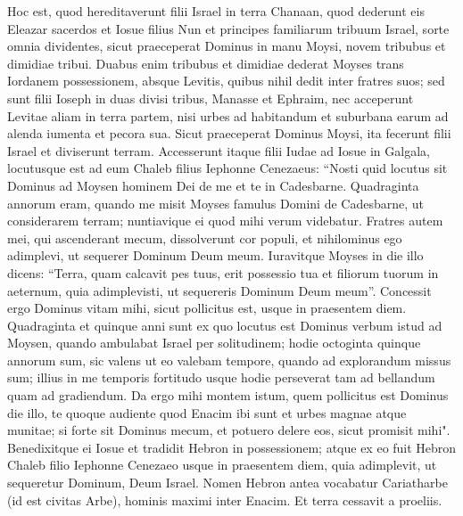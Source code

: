 \begin{biblechapter}  
\verse Hoc est, quod hereditaverunt filii Israel in terra Chanaan, quod dederunt eis Eleazar sacerdos et Iosue filius Nun et principes familiarum tribuum Israel, 
\verse sorte omnia dividentes, sicut praeceperat Dominus in manu Moysi, novem tribubus et dimidiae tribui. 
\verse Duabus enim tribubus et dimidiae dederat Moyses trans Iordanem possessionem, absque Levitis, quibus nihil dedit inter fratres suos; 
\verse sed sunt filii Ioseph in duas divisi tribus, Manasse et Ephraim, nec acceperunt Levitae aliam in terra partem, nisi urbes ad habitandum et suburbana earum ad alenda iumenta et pecora sua. 
\verse Sicut praeceperat Dominus Moysi, ita fecerunt filii Israel et diviserunt terram. 
\verse Accesserunt itaque filii Iudae ad Iosue in Galgala, locutusque est ad eum Chaleb filius Iephonne Cenezaeus: “Nosti quid locutus sit Dominus ad Moysen hominem Dei de me et te in Cadesbarne. 
\verse Quadraginta annorum eram, quando me misit Moyses famulus Domini de Cadesbarne, ut considerarem terram; nuntiavique ei quod mihi verum videbatur. 
\verse Fratres autem mei, qui ascenderant mecum, dissolverunt cor populi, et nihilominus ego adimplevi, ut sequerer Dominum Deum meum. 
\verse Iuravitque Moyses in die illo dicens: “Terra, quam calcavit pes tuus, erit possessio tua et filiorum tuorum in aeternum, quia adimplevisti, ut sequereris Dominum Deum meum”. 
\verse Concessit ergo Dominus vitam mihi, sicut pollicitus est, usque in praesentem diem. Quadraginta et quinque anni sunt ex quo locutus est Dominus verbum istud ad Moysen, quando ambulabat Israel per solitudinem; hodie octoginta quinque annorum sum, 
\verse sic valens ut eo valebam tempore, quando ad explorandum missus sum; illius in me temporis fortitudo usque hodie perseverat tam ad bellandum quam ad gradiendum. 
\verse Da ergo mihi montem istum, quem pollicitus est Dominus die illo, te quoque audiente quod Enacim ibi sunt et urbes magnae atque munitae; si forte sit Dominus mecum, et potuero delere eos, sicut promisit mihi". 
\verse Benedixitque ei Iosue et tradidit Hebron in possessionem; 
\verse atque ex eo fuit Hebron Chaleb filio Iephonne Cenezaeo usque in praesentem diem, quia adimplevit, ut sequeretur Dominum, Deum Israel. 
\verse Nomen Hebron antea vocabatur Cariatharbe (id est civitas Arbe), hominis maximi inter Enacim. Et terra cessavit a proeliis. 
\end{biblechapter}

